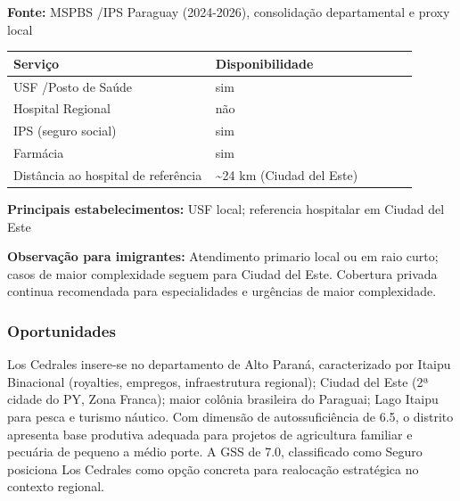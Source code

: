\textbf{Fonte:} MSPBS /\allowbreak  IPS Paraguay (2024-2026), consolidação
departamental e proxy local

{\def\LTcaptype{none} %
\begin{longtable}{@{}>{\raggedright\arraybackslash}p{0.45\linewidth} >{\raggedright\arraybackslash}p{0.45\linewidth}@{}}
\toprule\noalign{}
Serviço & Disponibilidade \\
\midrule\noalign{}
\endhead
\bottomrule\noalign{}
\endlastfoot
USF /\allowbreak  Posto de Saúde & sim \\
Hospital Regional & não \\
IPS (seguro social) & sim \\
Farmácia & sim \\
Distância ao hospital de referência & \textasciitilde24 km (Ciudad del
Este) \\
\end{longtable}
}

\textbf{Principais estabelecimentos:} USF local; referencia hospitalar
em Ciudad del Este

\textbf{Observação para imigrantes:} Atendimento primario local ou em
raio curto; casos de maior complexidade seguem para Ciudad del Este.
Cobertura privada continua recomendada para especialidades e urgências
de maior complexidade.
\newpage

\subsubsection*{Oportunidades}\label{oport-los-cedrales-1010}
Los Cedrales insere-se no departamento de Alto Paraná, caracterizado por Itaipu Binacional (royalties, empregos, infraestrutura regional); Ciudad del Este (2ª cidade do PY, Zona Franca); maior colônia brasileira do Paraguai; Lago Itaipu para pesca e turismo náutico. Com dimensão de autossuficiência de 6.5, o distrito apresenta base produtiva adequada para projetos de agricultura familiar e pecuária de pequeno a médio porte. A GSS de 7.0, classificado como Seguro posiciona Los Cedrales como opção concreta para realocação estratégica no contexto regional.

